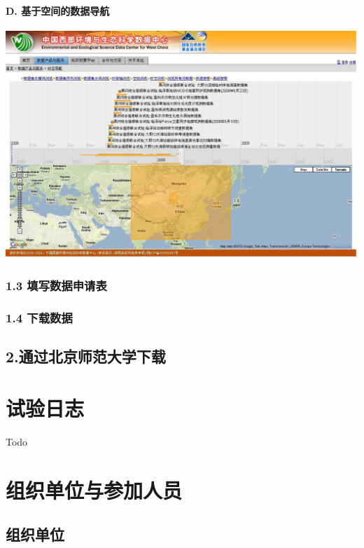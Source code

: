 \documentclass[letterpaper,10pt,english]{sphinxmanual}
\begin{document}
\subsubsection{D. 基于空间的数据导航}
\label{data_acquire:d}
{\hfill\includegraphics{westdc_nav_space.jpg}\hfill}


\subsection{1.3 填写数据申请表}
\label{data_acquire:id5}

\subsection{1.4 下载数据}
\label{data_acquire:id6}

\section{2.通过北京师范大学下载}
\label{data_acquire:id7}

\chapter{试验日志}
\label{water_blog:water-blog}\label{water_blog::doc}\label{water_blog:id1}
Todo


\chapter{组织单位与参加人员}
\label{water_partner::doc}\label{water_partner:doc-arou}\label{water_partner:id1}

\section{组织单位}
\label{water_partner:id2}
\end{document}
